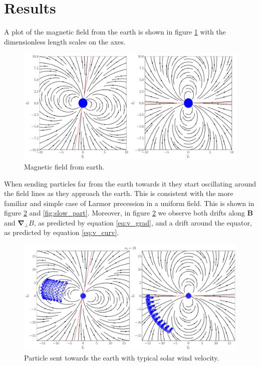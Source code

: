 \section{Results}

A plot of the magnetic field from the earth is shown in figure \ref{fig:earth} with the dimensionless length scales on the axes. 

\begin{figure}[htb]
	\centering
	\includegraphics[width=\columnwidth]{../fig/earth.pdf}
	\caption{Magnetic field from earth.}
	\label{fig:earth}
\end{figure}

When sending particles far from the earth towards it they start oscillating around the field lines as they approach the earth. This is consistent with the more familiar and simple case of Larmor precession in a uniform field. This is shown in figure \ref{fig:fast_part} and \ref{fig:slow_part}. 
Moreover, in figure \ref{fig:fast_part} we observe both drifts along $\mathbf{B}$ and $\boldsymbol{\nabla}_\perp B$, as predicted by equation \eqref{eq:v_grad}, and a drift around the equator, as predicted by equation \eqref{eq:v_curv}.

\begin{figure}[htb]
	\centering
	\includegraphics[width=\columnwidth]{../fig/earth_traj_fast.pdf}
	\caption{Particle sent towards the earth with typical solar wind velocity.}
	\label{fig:fast_part}
\end{figure}

